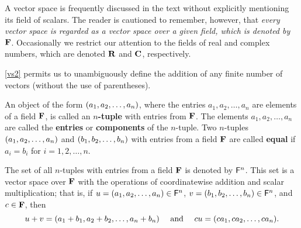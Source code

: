 \begin{note}
    A vector space is frequently discussed in the text without explicitly mentioning its field of scalars.
    The reader is cautioned to remember, however, that \emph{every vector space is regarded as a vector space over a given field, which is denoted by \(\mathbf{F}\)}.
    Occasionally we restrict our attention to the fields of real and complex numbers, which are denoted \(\mathbf{R}\) and \(\mathbf{C}\), respectively.
\end{note}

\begin{note}
    \ref{vs2} permits us to unambiguously define the addition of any finite number of vectors
    (without the use of parentheses).
\end{note}

\begin{defn}\label{1.2.3}
    An object of the form \(\left\lparen{a}_{1}, {a}_{2}, \dots, {a}_{n}\right\rparen\), where the entries \(a_{1}, a_{2}, \dots, a_{n}\) are elements of a field \(\mathbf{F}\), is called an \textbf{\(n\)-tuple} with entries from \(\mathbf{F}\).
    The elements \(a_{1}, a_{2}, \dots, a_{n}\) are called the \textbf{entries} or \textbf{components} of the \(n\)-tuple.
    Two \(n\)-tuples \(\left\lparen{a}_{1}, {a}_{2}, \dots, {a}_{n}\right\rparen\) and \(\left\lparen{b}_{1}, {b}_{2}, \dots, {b}_{n}\right\rparen\) with entries from a field \(\mathbf{F}\) are called \textbf{equal} if \(a_i = b_i\) for \(i = 1, 2, \dots, n\).
\end{defn}

\begin{eg}\label{1.2.4}
    The set of all \(n\)-tuples with entries from a field \(\mathbf{F}\) is denoted by \(\mathsf{F}^{n}\).
    This set is a vector space over \(\mathbf{F}\) with the operations of coordinatewise addition and scalar multiplication;
    that is, if \(u = \left\lparen{a}_{1}, {a}_{2}, \dots, {a}_{n}\right\rparen \in \mathsf{F}^{n}\), \(v = \left\lparen{b}_{1}, {b}_{2}, \dots, {b}_{n}\right\rparen \in \mathsf{F}^{n}\), and \(c \in \mathbf{F}\), then
    \[
        u + v = (a_{1} + b_{1}, a_{2} + b_{2}, \dots, a_{n} + b_{n}) \quad \text{ and } \quad cu = \tp{ca}{n}.
    \]
\end{eg}

